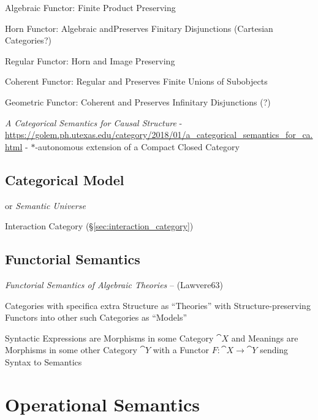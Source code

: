 Algebraic Functor: Finite Product Preserving

Horn Functor: Algebraic andPreserves Finitary Disjunctions (Cartesian
Categories?)

Regular Functor: Horn and Image Preserving

Coherent Functor: Regular and Preserves Finite Unions of Subobjects

Geometric Functor: Coherent and Preserves Infinitary Disjunctions (?)

\emph{A Categorical Semantics for Causal Structure} -
\url{https://golem.ph.utexas.edu/category/2018/01/a_categorical_semantics_for_ca.html}
- $*$-autonomous extension of a Compact Closed Category



\subsection{Categorical Model}\label{sec:categorical_model}

or \emph{Semantic Universe}

Interaction Category (\S\ref{sec:interaction_category})



\subsection{Functorial Semantics}\label{sec:functorial_semantics}

\emph{Functorial Semantics of Algebraic Theories} -- (Lawvere63)

Categories with specifica extra Structure as ``Theories'' with
Structure-preserving Functors into other such Categories as ``Models''

Syntactic Expressions are Morphisms in some Category $\cat{X}$ and
Meanings are Morphisms in some other Category $\cat{Y}$ with a Functor
$F : \cat{X} \rightarrow \cat{Y}$ sending Syntax to Semantics



\section{Operational Semantics}\label{sec:operational_semantics}

